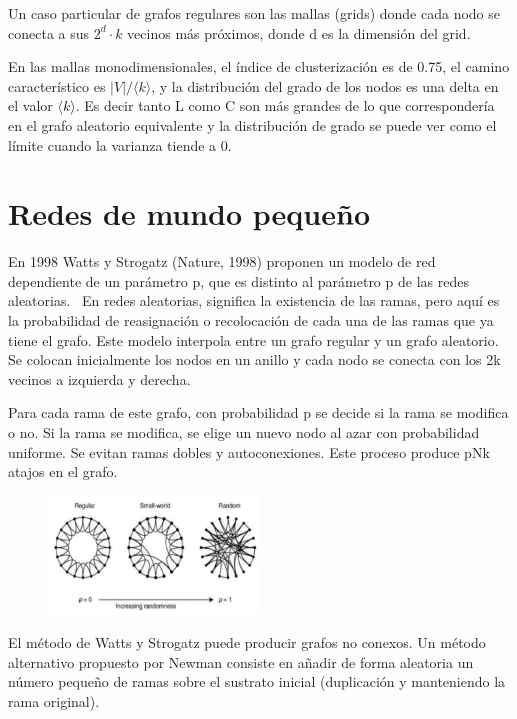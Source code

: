 Un caso particular de grafos regulares son las mallas (grids) donde cada nodo se conecta a sus $2^d \cdot k$ vecinos más próximos, donde d es la dimensión del grid.

En las mallas monodimensionales, el índice de clusterización es de 0.75, el camino característico es $|V|/\langle k \rangle$, y la distribución del grado de los nodos es una delta en el valor $\langle k \rangle$. Es decir tanto L como C son más grandes de lo que correspondería en el grafo aleatorio equivalente y la distribución de grado se puede ver como el límite cuando la varianza tiende a 0.

\section{Redes de mundo pequeño}
En 1998 Watts y Strogatz (Nature, 1998) proponen un modelo de red dependiente de un parámetro p, que es distinto al parámetro p de las redes aleatorias. 
 \
En redes aleatorias, significa la existencia de las ramas, pero aquí es la probabilidad de reasignación o recolocación de cada una de las ramas que ya tiene el grafo. 
 Este modelo interpola entre un grafo regular y un grafo aleatorio. Se colocan inicialmente los nodos en un anillo y cada nodo se conecta con los 2k vecinos a izquierda y derecha.

Para cada rama de este grafo, con probabilidad p se decide si la rama se modifica o no.
Si la rama se modifica, se elige un nuevo nodo al azar con probabilidad uniforme. Se evitan ramas dobles y autoconexiones. Este proceso produce pNk atajos en el grafo.

\begin{figure}[h]
\centering
\includegraphics[width = 0.5\textwidth]{figs/grafos.png}
\end{figure}

El método de Watts y Strogatz puede producir grafos no conexos. Un método alternativo propuesto por Newman consiste en añadir de forma aleatoria un número pequeño de ramas sobre el sustrato inicial (duplicación y manteniendo la rama original).

